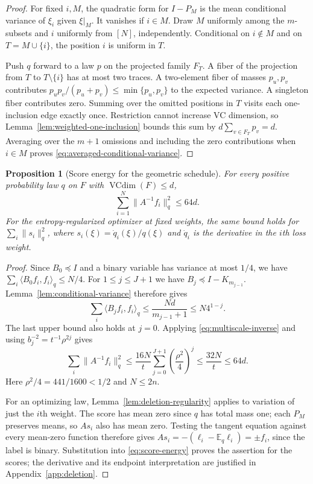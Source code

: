 \documentclass[11pt]{article}
\newtheorem{proposition}[theorem]{Proposition}
\theoremstyle{definition}\newtheorem{definition}[theorem]{Definition}
\begin{document}
\begin{proof}
For fixed $i,M$, the quadratic form for $I-P_M$ is the mean
conditional variance of $\xi_i$ given $\xi|_M$. It vanishes if $i\in M$.
Draw $M$ uniformly among the $m$-subsets and $i$ uniformly from $[N]$,
independently. Conditional on $i\notin M$ and on $T=M\cup\{i\}$, the
position $i$ is uniform in $T$.

Push $q$ forward to a law $p$ on the projected family $F_T$. A fiber
of the projection from $T$ to $T\setminus\{i\}$ has at most two traces.
A two-element fiber of masses $p_u,p_v$ contributes
$p_up_v/(p_u+p_v)\leq\min\{p_u,p_v\}$ to the expected variance.
A singleton fiber contributes zero. Summing over the omitted positions
in $T$ visits each one-inclusion edge exactly once. Restriction cannot
increase VC dimension, so Lemma~\ref{lem:weighted-one-inclusion} bounds
this sum by $d\sum_{v\in F_T}p_v=d$. Averaging over the $m+1$ omissions
and including the zero contributions when $i\in M$ proves
\eqref{eq:averaged-conditional-variance}.
\end{proof}

\begin{proposition}[Score energy for the geometric schedule]
\label{prop:score-energy}
For every positive probability law $q$ on $F$ with $\operatorname{VCdim}(F)\leq d$,
\begin{equation}
  \label{eq:score-energy}
  \sum_{i=1}^N\|A^{-1} f_i\|_q^2\leq 64d.
\end{equation}
For the entropy-regularized optimizer at fixed weights, the same bound
holds for $\sum_i\|s_i\|_q^2$, where $s_i(\xi)=\dot q_i(\xi)/q(\xi)$
and $\dot q_i$ is the derivative in the $i$th loss weight.
\end{proposition}

\begin{proof}
Since $B_0\preceq I$ and a binary variable has variance at most $1/4$,
we have
$\sum_i\langle B_0f_i,f_i\rangle_q\leq N/4$.
For $1\leq j\leq J+1$ we have $B_j\preceq I-K_{m_{j-1}}$.
Lemma~\ref{lem:conditional-variance} therefore gives
\[
  \sum_i\langle B_jf_i,f_i\rangle_q
  \leq\frac{Nd}{m_{j-1}+1}\leq N4^{1-j}.
\]
The last upper bound also holds at $j=0$. Applying
\eqref{eq:multiscale-inverse} and using $b_j^{-2}=t^{-1}\rho^{2j}$ gives
\[
  \sum_i\|A^{-1}f_i\|_q^2
  \leq\frac{16N}{t}\sum_{j=0}^{J+1}\left(\frac{\rho^2}{4}\right)^j
  \leq\frac{32N}{t}\leq64d.
\]
Here $\rho^2/4=441/1600<1/2$ and $N\leq 2n$.

For an optimizing law, Lemma~\ref{lem:deletion-regularity} applies to
variation of just the $i$th weight. The score has mean zero since
$q$ has total mass one; each $P_M$ preserves means, so $As_i$ also
has mean zero. Testing the tangent equation against every mean-zero
function therefore gives
$A s_i=-(\ell_i-\mathbb E_q\ell_i)=\pm f_i$, since the label is binary.
Substitution into \eqref{eq:score-energy} proves the assertion for the
scores; the derivative and its endpoint interpretation are justified in
Appendix~\ref{app:deletion}.
\end{proof}
\end{document}
